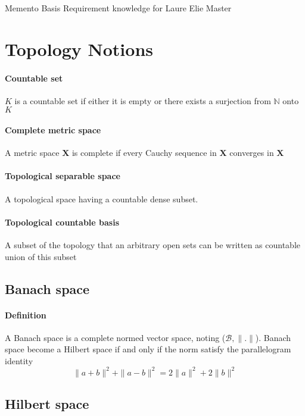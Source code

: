 \documentclass[a4paper,10pt]{article}
\begin{document}
\begin{center}Memento Basis Requirement knowledge for Laure Elie Master\end{center}
\section{Topology Notions}
\paragraph{Countable set} $K$ is a countable set if either it is empty or there exists a surjection from $\mathbb{N}$ onto $K$ 


\paragraph{Complete metric space} A metric space $\textbf{X}$ is complete if every Cauchy sequence in $\textbf{X}$ converges in $\textbf{X}$ 

\paragraph{Topological separable space} A topological space having a countable dense subset.

\paragraph{Topological countable basis} A subset of the topology that an arbitrary open sets can be written as countable union of this subset

\subsection{Banach space}
\paragraph{Definition} A Banach space is a complete normed vector space, noting ($\mathcal{B}, \|.\|$). Banach space become a Hilbert space if and only if the norm satisfy the parallelogram identity
\[
\| a+b \|^2  + \| a-b \|^2 = 2\|a\|^2  + 2\|b\|^2 
\]

\subsection{Hilbert space} 
\end{document}
